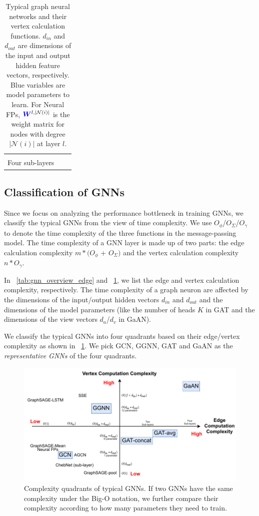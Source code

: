 \begin{table}
\begin{footnotesize}
\begin{tabular}{cp{20em}r}
			\makecell[r]{$O(max(K * d_v + d_{in}, 2 * d_{in} + d_m) * d_{out})$\\
                         Four sub-layers}
            \\ \bottomrule
		\end{tabular}
	\end{footnotesize}
	\caption{Typical graph neural networks and their vertex calculation functions.
		$d_{in}$ and $d_{out}$ are dimensions of the input and output hidden feature vectors, respectively.
		Blue variables are model parameters to learn.
		For Neural FPs, $\textcolor{blue}{\boldsymbol{W}}^{l, |\mathcal{N}(i)|}$ is the weight matrix for nodes with degree $|\mathcal{N}(i)|$ at layer $l$.}
	\label{tab:gnn_overview_vertex}
\end{table}

\subsection{Classification of GNNs}

Since we focus on analyzing the performance bottleneck in training GNNs, we classify the typical GNNs from the view of time complexity.
We use $O_\phi$/$O_\Sigma$/$O_\gamma$ to denote the time complexity of the three functions in the message-passing model.
The time complexity of a GNN layer is made up of two parts: the edge calculation complexity $m * (O_\phi$ + $O_\Sigma)$ and the vertex calculation complexity $n * O_\gamma$.

In \tablename~\ref{tab:gnn_overview_edge} and \tablename~\ref{tab:gnn_overview_vertex}, we list the edge and vertex calculation complexity, respectively.
The time complexity of a graph neuron are affected by the dimensions of the input/output hidden vectors $d_{in}$ and $d_{out}$ and the dimensions of the model parameters (like the number of heads $K$ in GAT and the dimensions of the view vectors $d_a$/$d_v$ in GaAN).

We classify the typical GNNs into four quadrants based on their edge/vertex complexity as shown in \figurename~\ref{fig:gnn_complexity_quadrant}. We pick GCN, GGNN, GAT and GaAN as the \emph{representative GNNs} of the four quadrants.

\begin{figure}
	\centering
	\includegraphics[width=0.7\columnwidth]{figs/illustration/GNN_complexity_quadrant.pdf}
	\caption{Complexity quadrants of typical GNNs. If two GNNs have the same complexity under the Big-O notation, we further compare their complexity according to how many parameters they need to train.}
	\label{fig:gnn_complexity_quadrant}
\end{figure}

